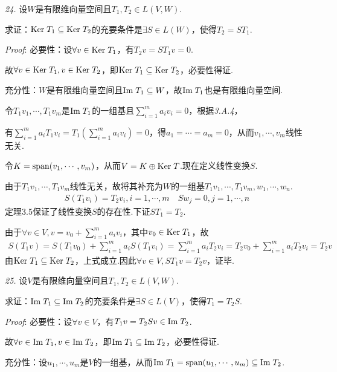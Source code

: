 \hspace*{\fill}

\textit{24.}
设\(W\)是有限维向量空间且\(T_1,T_2 \in L(V,W)\).

求证：\(\mathrm{Ker \;} T_1 \subseteq \mathrm{Ker \;} T_2\)的充要条件是\(\exists S \in L(W)\)，使得\(T_2=ST_1\).

\textit{Proof}:
必要性：设\(\forall v \in \mathrm{Ker \;} T_1\)，有\(T_2v=ST_1v=0\).

故\(\forall v \in \mathrm{Ker \;} T_1, v \in \mathrm{Ker \;} T_2\)，即\(\mathrm{Ker \;} T_1 \subseteq \mathrm{Ker \;} T_2\)，必要性得证.

充分性：\(W\)是有限维向量空间且\(\mathrm{Im \;} T_1 \subseteq W\)，故\(\mathrm{Im \;} T_1\)也是有限维向量空间.

令\(T_1v_1,\cdots,T_1v_m\)是\(\mathrm{Im \;} T_1\)的一组基且\(\sum_{i=1}^m a_iv_i=0\)，根据\textit{3.A.4}，

有\(\sum_{i=1}^m a_iT_1v_i=T_1(\sum_{i=1}^m a_iv_i)=0\)，得\(a_1=\cdots=a_m=0\)，从而\(v_1,\cdots,v_m\)线性无关.

令\(K=\mathrm{span} (v_1,\cdots,v_m)\)，从而\(V=K \oplus \mathrm{Ker \;} T\).现在定义线性变换\(S\).

由于\(T_1v_1,\cdots,T_1v_m\)线性无关，故将其补充为\(W\)的一组基\(T_1v_1,\cdots,T_1v_m,w_1,\cdots,w_n\).
    \begin{align*}
        S(T_1v_i)=T_2v_i,i=1,\cdots,m \quad Sw_j=0,j=1,\cdots,n
    \end{align*}
定理3.5保证了线性变换\(S\)的存在性.下证\(ST_1=T_2\).

由于\(\forall v \in V, v=v_0+\sum_{i=1}^m a_iv_i\)，其中\(v_0 \in \mathrm{Ker \;} T_1\)，故
    \begin{align*}
        S(T_1v)=S(T_1v_0)+\sum_{i=1}^m a_iS(T_1v_i)
        =\sum_{i=1}^m a_iT_2v_i=T_2v_0+\sum_{i=1}^m a_iT_2v_i=T_2v
    \end{align*}
由\(\mathrm{Ker \;} T_1 \subseteq \mathrm{Ker \;} T_2\)，上式成立.因此\(\forall v \in V, ST_1v=T_2v\)，证毕.

\newpage

\textit{25.}
设\(V\)是有限维向量空间且\(T_1,T_2 \in L(V,W)\).

求证：\(\mathrm{Im \;} T_1 \subseteq \mathrm{Im \;} T_2\)的充要条件是\(\exists S \in L(V)\)，使得\(T_1=T_2S\).

\textit{Proof}:
必要性：设\(\forall v \in V\)，有\(T_1v=T_2Sv \in \mathrm{Im \;} T_2\).

故\(\forall v \in \mathrm{Im \;} T_1, v \in \mathrm{Im \;} T_2\)，即\(\mathrm{Im \;} T_1 \subseteq \mathrm{Im \;} T_2\)，必要性得证. 

充分性：设\(u_1,\cdots,u_m\)是\(V\)的一组基，从而\(\mathrm{Im \;} T_1=\mathrm{span}(u_1,\cdots,u_m) \subseteq \mathrm{Im \;} T_2\).

